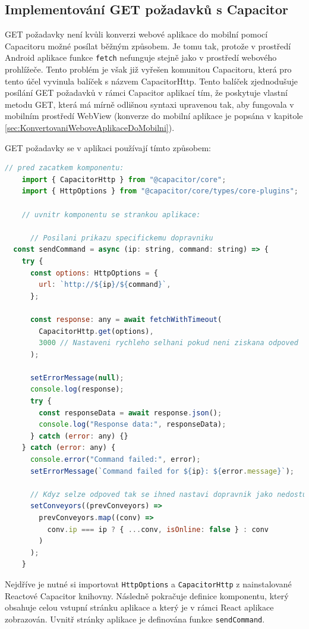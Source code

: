 \subsection{Implementování GET požadavků s Capacitor}

GET požadavky není kvůli konverzi webové aplikace do mobilní pomocí Capacitoru možné posílat běžným způsobem. Je tomu tak, protože v prostředí Android aplikace funkce \texttt{fetch} nefunguje stejně jako v prostředí webového prohlížeče. Tento problém je však již vyřešen komunitou Capacitoru, která pro tento účel vyvinula balíček s názvem CapacitorHttp. Tento balíček zjednodušuje posílání GET požadavků v rámci Capacitor aplikací tím, že poskytuje vlastní metodu GET, která má mírně odlišnou syntaxi upravenou tak, aby fungovala v mobilním prostředí WebView (konverze do mobilní aplikace je popsána v kapitole \ref{sec:KonvertovaniWeboveAplikaceDoMobilni}).

GET požadavky se v aplikaci používají tímto způsobem:
\begin{lstlisting}[language=JavaScript, caption={Rozšířený způsob posílání GET požadavků pro Capacitor mobilní aplikace}, label={lst:SendCommandFunkce}]
    // pred zacatkem komponentu:
    import { CapacitorHttp } from "@capacitor/core";
    import { HttpOptions } from "@capacitor/core/types/core-plugins";

    // uvnitr komponentu se strankou aplikace:

      // Posilani prikazu specifickemu dopravniku
  const sendCommand = async (ip: string, command: string) => {
    try {
      const options: HttpOptions = {
        url: `http://${ip}/${command}`,
      };

      const response: any = await fetchWithTimeout(
        CapacitorHttp.get(options),
        3000 // Nastaveni rychleho selhani pokud neni ziskana odpoved
      );

      setErrorMessage(null);
      console.log(response);
      try {
        const responseData = await response.json();
        console.log("Response data:", responseData);
      } catch (error: any) {}
    } catch (error: any) {
      console.error("Command failed:", error);
      setErrorMessage(`Command failed for ${ip}: ${error.message}`);

      // Kdyz selze odpoved tak se ihned nastavi dopravnik jako nedostupny
      setConveyors((prevConveyors) =>
        prevConveyors.map((conv) =>
          conv.ip === ip ? { ...conv, isOnline: false } : conv
        )
      );
    }
\end{lstlisting}
Nejdříve je nutné si importovat \texttt{HttpOptions} a \texttt{CapacitorHttp} z nainstalované Reactové Capacitor knihovny. Následně pokračuje definice komponentu, který obsahuje celou vstupní stránku aplikace a který je v rámci React aplikace zobrazován. Uvnitř stránky aplikace je definována funkce \texttt{sendCommand}.

